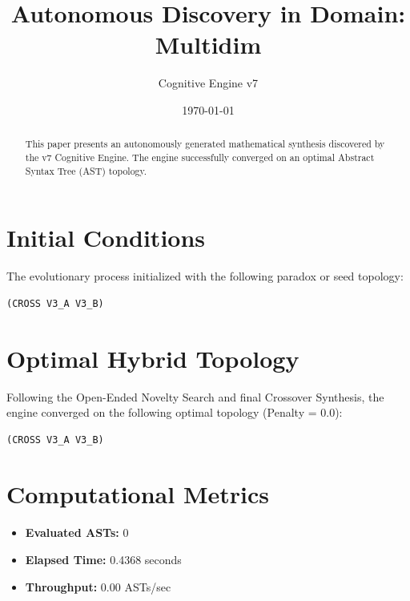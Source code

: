 \documentclass{article}
\title{Autonomous Discovery in Domain: Multidim}
\author{Cognitive Engine v7}
\date{\today}
\begin{document}
\maketitle
\begin{abstract}
This paper presents an autonomously generated mathematical synthesis discovered by the v7 Cognitive Engine. The engine successfully converged on an optimal Abstract Syntax Tree (AST) topology.\end{abstract}
\section{Initial Conditions}
The evolutionary process initialized with the following paradox or seed topology:
\begin{verbatim}
(CROSS V3_A V3_B)
\end{verbatim}
\section{Optimal Hybrid Topology}
Following the Open-Ended Novelty Search and final Crossover Synthesis, the engine converged on the following optimal topology (Penalty = 0.0):
\begin{verbatim}
(CROSS V3_A V3_B)
\end{verbatim}
\section{Computational Metrics}
\begin{itemize}
  \item \textbf{Evaluated ASTs:} 0
  \item \textbf{Elapsed Time:} 0.4368 seconds
  \item \textbf{Throughput:} 0.00 ASTs/sec
\end{itemize}
\end{document}
